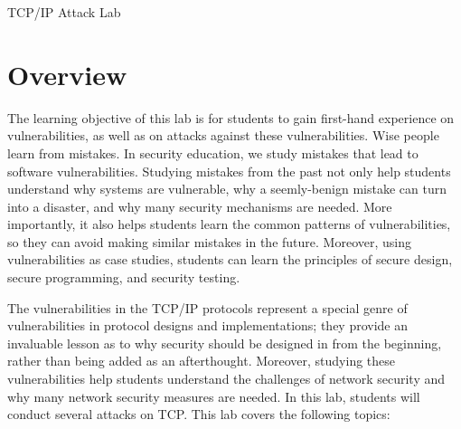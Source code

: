 

\newcommand{\commonfolder}{../../common-files}





\newcommand{\telnet} {\texttt{telnet}\xspace}
\newcommand{\tcpFigs}{./Figs}




\setcounter{task}{1}
\newcommand{\mytask} {\bf {\noindent \arabic{task}} \addtocounter{task}{1} \,}



\begin{center}
{\LARGE TCP/IP Attack Lab}
\end{center}




\section{Overview}


The learning objective of this lab is for students to gain first-hand
experience on vulnerabilities, as well as on attacks against these
vulnerabilities. Wise people learn from mistakes. In security education, we
study mistakes that lead to software vulnerabilities. Studying mistakes
from the past not only help students understand why systems are vulnerable,
why a seemly-benign mistake can turn into a disaster, and why many
security mechanisms are needed. More importantly, it also helps students
learn the common patterns of vulnerabilities, so they can avoid making
similar mistakes in the future. Moreover, using vulnerabilities as case
studies, students can learn the principles of secure design, secure
programming, and security testing.

The vulnerabilities in the TCP/IP protocols represent a special genre of
vulnerabilities in protocol designs and implementations; they provide an
invaluable lesson as to why security should be designed in from the
beginning, rather than being added as an afterthought. Moreover, studying
these vulnerabilities help students understand the challenges of network
security and why many network security measures are needed.
In this lab, students will conduct several attacks on TCP.
This lab covers the following topics:

